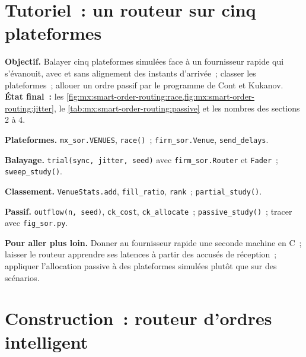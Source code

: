 \section{Tutoriel~: un routeur sur cinq plateformes}\label{tut:mx:smart-order-routing:tut}

\begin{tutorial}
\textbf{Objectif.} Balayer cinq plateformes simulées face à un fournisseur rapide qui s'évanouit, avec et sans alignement des instants d'arrivée~; classer les plateformes~; allouer un
ordre passif par le programme de Cont et Kukanov.
\textbf{État final~:} les \cref{fig:mx:smart-order-routing:race,fig:mx:smart-order-routing:jitter}, le \cref{tab:mx:smart-order-routing:passive} et les nombres
des sections 2 à 4.
\begin{tutsteps}
\item \textbf{Plateformes.} \texttt{mx\_sor.VENUES}, \texttt{race()}~; \texttt{firm\_sor.Venue}, \texttt{send\_delays}.
\item \textbf{Balayage.} \texttt{trial(sync, jitter, seed)} avec \texttt{firm\_sor.Router} et \texttt{Fader}~; \texttt{sweep\_study()}.
\item \textbf{Classement.} \texttt{VenueStats.add}, \texttt{fill\_ratio}, \texttt{rank}~; \texttt{partial\_study()}.
\item \textbf{Passif.} \texttt{outflow(n, seed)}, \texttt{ck\_cost}, \texttt{ck\_allocate}~; \texttt{passive\_study()}~; tracer avec \texttt{fig\_sor.py}.
\end{tutsteps}
\textbf{Pour aller plus loin.} Donner au fournisseur rapide une seconde machine en C~; laisser le routeur apprendre ses latences à partir des accusés de réception~; appliquer l'allocation passive
à des plateformes simulées plutôt que sur des scénarios.
\end{tutorial}

\section{Construction~: routeur d'ordres intelligent}\label{bld:mx:smart-order-routing:sor}

